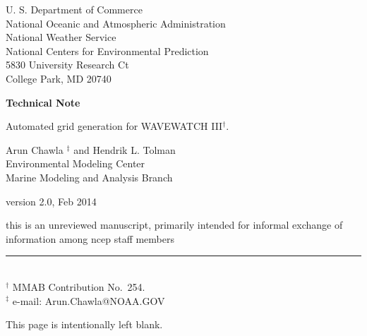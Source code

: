 \documentclass[12pt]{article}
\newcommand{\pstyle}{plain}
\newcommand{\bpage}{\vfill \pagebreak \strut

\vspace{2.5in} \centerline{This page is intentionally left blank.}}
\begin{document}

\pagestyle{empty}

\strut \vspace{5mm}

\begin{center}
U. S. Department of Commerce \\
National Oceanic and Atmospheric Administration \\
National Weather Service \\
National Centers for Environmental Prediction \\
5830 University Research Ct \\
College Park, MD 20740

\vspace{15mm}

{\bf Technical Note}

\vspace{15mm}

{\large Automated grid generation for WAVEWATCH III$^\dag$.}

\vspace{20mm}

Arun Chawla $^\ddag$ and Hendrik L. Tolman\\
Environmental Modeling Center \\
Marine Modeling and Analysis Branch

\vspace{25mm}

version 2.0, Feb 2014

\vfill {\sc this is an unreviewed manuscript, primarily
intended for informal exchange of information among ncep staff
members}

\end{center}
\noindent \rule{140mm}{0.5mm} \\
{\small $^\dag$ MMAB Contribution No.~254. \\
$^\ddag$ e-mail: Arun.Chawla@NOAA.GOV}

\bpage

\pagebreak

\pagestyle{\pstyle}
\setcounter{page}{1}

\end{document}
